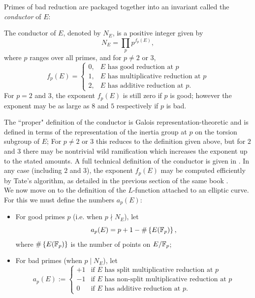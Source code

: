 Primes of bad reduction are packaged together into an invariant called the {\it conductor} of $E$:
\begin{definition}
The conductor of $E$, denoted by $N_E$, is a positive integer given by
\begin{equation}
N_E = \prod_{p} p^{f_p(E)},
\end{equation}
where $p$ ranges over all primes, and for $p \ne 2$ or $3$,
\begin{equation}
f_p(E) = \begin{cases} 0, & \text{$E$ has good reduction at $p$} \\ 1, & \text{$E$ has multiplicative reduction at $p$} \\ 2, & \text{$E$ has additive reduction at $p$.}\end{cases}
\end{equation}
For $p=2$ and $3$, the exponent $f_p(E)$ is still zero if $p$ is good; however the exponent may be as large as $8$ and $5$ respectively if $p$ is bad.
\end{definition}
The ``proper" definition of the conductor is Galois representation-theoretic and is defined in terms of the representation of the inertia group at $p$ on the torsion subgroup of $E$; For $p\ne 2$ or $3$ this reduces to the definition given above, but for $2$ and $3$ there may be nontrivial wild ramification which increases the exponent up to the stated amounts. A full technical definition of the conductor is given in \cite[pp. 379-396]{Sil-1994}. In any case (including $2$ and $3$), the exponent $f_p(E)$ may be computed efficiently by Tate's algorithm, as detailed in the previous section of the same book \cite[pp. 361-379]{Sil-1994}. \\

We now move on to the definition of the $L$-function attached to an elliptic curve. For this we must define the numbers $a_p(E)$:
\begin{definition}\label{def:a_p} \mbox{}
\begin{itemize}
\item For good primes $p$ (i.e. when $p \nmid N_E$), let
\begin{equation}
a_p(E) = p+1-\#\left\{E(\mathbb{F}_p)\right\},
\end{equation}
where $\#\left\{E(\mathbb{F}_p)\right\}$ is the number of points on $E/\mathbb{F}_p$;
\item For bad primes (when $p \mid N_E$), let
\begin{equation}
a_p(E) := \begin{cases}
+1 & \text{if $E$ has split multiplicative reduction at $p$} \\
-1 & \text{if $E$ has non-split multiplicative reduction at $p$} \\
0 & \text{if $E$ has additive reduction at $p$.}
\end{cases}
\end{equation}
\end{itemize}
\end{definition}

